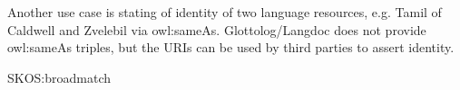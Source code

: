 \documentclass[10pt, a4paper]{article}
\begin{document}
Another use case is stating of identity
of two language resources, e.g. Tamil of Caldwell and Zvelebil via owl:sameAs.
Glottolog/Langdoc does not provide owl:sameAs triples, but the URIs can be
used by third parties to assert identity.

SKOS:broadmatch

 
% 
%  
% 
 

  


\end{document}
